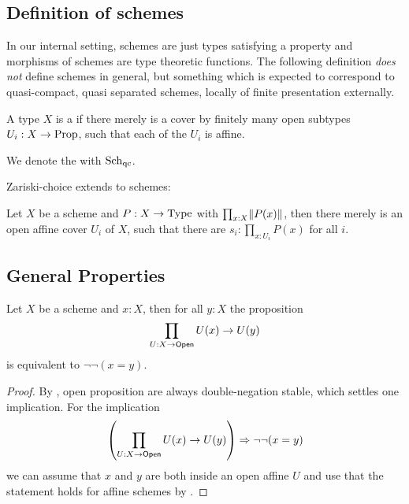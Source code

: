 
\subsection{Definition of schemes}

In our internal setting, schemes are just types satisfying a property and morphisms of schemes are type theoretic functions.
The following definition \emph{does not} define schemes in general,
but something which is expected to correspond to quasi-compact, quasi separated schemes,
locally of finite presentation externally.

\begin{definition}%
  \label{schemes}
  A type $X$ is a 
  if there merely is a cover by finitely many open subtypes $U_i:X\to\mathrm{Prop}$,
  such that each of the $U_i$ is affine.
\end{definition}

\begin{definition}
  \label{type-of-schemes}
  We denote the  with $\Sch$\index{$\Sch$}.
\end{definition}

Zariski-choice  extends to schemes:

\begin{proposition}%
  \label{zariski-choice-scheme}
  Let $X$ be a scheme and $P:X\to \mathrm{Type}$ with $\prod_{x:X}\lVert P(x) \rVert$,
  then there merely is an open affine cover $U_i$ of $X$,
  such that there are $s_i:\prod_{x:U_i}P(x)$ for all $i$.
\end{proposition}

\subsection{General Properties}

\begin{lemma}%
  \label{intersection-of-all-opens}
  Let $X$ be a scheme and $x:X$, then for all $y:X$ the proposition
  \[ \prod_{U:X\to \mathsf{Open}}U(x)\to U(y) \]
  is equivalent to $\neg\neg (x=y)$.
\end{lemma}

\begin{proof}
  By ,
  open proposition are always double-negation stable,
  which settles one implication.
  For the implication
  \[ \left(\prod_{U:X\to \mathsf{Open}}U(x)\to U(y)\right) \Rightarrow \neg\neg (x=y) \]
  we can assume that $x$ and $y$ are both inside an open affine $U$
  and use that the statement holds for affine schemes by .
\end{proof}

